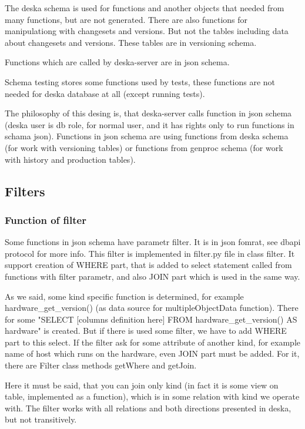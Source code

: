 \documentclass[deska]{subfiles}
\begin{document}
The deska schema is used for functions and another objects that needed from many functions, but are not generated. There are also functions for manipulationg with changesets and versions.
But not the tables including data about changesets and versions. These tables are in versioning schema.

Functions which are called by deska-server are in json schema.

Schema testing stores some functions used by tests, these functions are not needed for deska database at all (except running tests).

The philosophy of this desing is, that deska-server calls function in json schema (deska user is db role, for normal user, and it has rights only to run functions in schama json). Functions in json schema are using functions from deska schema (for work with versioning tables) or functions from genproc schema (for work with history and production tables).

\subsection{Filters}

\subsubsection{Function of filter}

Some functions in json schema have parametr filter. It is in json fomrat, see dbapi protocol for more info.
This filter is implemented in filter.py file in class filter. It support creation of WHERE part, that is added to select statement called from functions with filter parametr, and also JOIN part which is used in the same way.

As we said, some kind specific function is determined, for example hardware\_get\_version() (as data source for multipleObjectData function). There for some "SELECT [columns definition here] FROM hardware\_get\_version() AS hardware" is created. But if there is used some filter, we have to add WHERE part to this select. If the filter ask for some attribute of another kind, for example name of host which runs on the hardware, even JOIN part must be added. For it, there are Filter class methods getWhere and getJoin. 

Here it must be said, that you can join only kind (in fact it is some view on table, implemented as a function), which is in some relation with kind we operate with. The filter works with all relations and both directions presented in deska, but not transitively.
\end{document}
